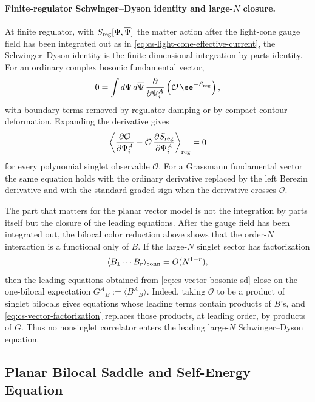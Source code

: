\paragraph{Finite-regulator Schwinger--Dyson identity and large-\(N\) closure.}
At finite regulator, with \(S_{\rm reg}[\Psi,\overline\Psi]\) the matter
action after the light-cone gauge field has been integrated out as in
\eqref{eq:cs-light-cone-effective-current}, the Schwinger--Dyson identity is
the finite-dimensional integration-by-parts identity.  For an ordinary
complex bosonic fundamental vector,
\[
  0
  =
  \int d\Psi\,d\overline\Psi\,
  \frac{\partial}{\partial\Psi_i^A}
  \left(\mathcal O\,\ee^{-S_{\rm reg}}\right),
\]
with boundary terms removed by regulator damping or by compact contour
deformation.  Expanding the derivative gives
\begin{equation}
  \left\langle
  \frac{\partial \mathcal O}{\partial \Psi_i^A}
  -
  \mathcal O\,\frac{\partial S_{\rm reg}}{\partial \Psi_i^A}
  \right\rangle_{\rm reg}
  =
  0
  \label{eq:cs-vector-bosonic-sd}
\end{equation}
for every polynomial singlet observable \(\mathcal O\).  For a Grassmann
fundamental vector the same equation holds with the ordinary derivative
replaced by the left Berezin derivative and with the standard graded sign
when the derivative crosses \(\mathcal O\).

The part that matters for the planar vector model is not the integration by
parts itself but the closure of the leading equations.  After the gauge field
has been integrated out, the bilocal color reduction above shows that the
order-\(N\) interaction is a functional only of \(B\).  If the large-\(N\)
singlet sector has factorization
\begin{equation}
  \langle B_1\cdots B_r\rangle_{\rm conn}=O(N^{1-r}),
  \label{eq:cs-vector-factorization}
\end{equation}
then the leading equations obtained from
\eqref{eq:cs-vector-bosonic-sd} close on the one-bilocal expectation
\(G^A{}_{B}:=\langle B^A{}_{B}\rangle\).  Indeed, taking \(\mathcal O\) to be
a product of singlet bilocals gives equations whose leading terms contain
products of \(B\)'s, and \eqref{eq:cs-vector-factorization} replaces those
products, at leading order, by products of \(G\).  Thus no nonsinglet
correlator enters the leading large-\(N\) Schwinger--Dyson equation.

\subsection{Planar Bilocal Saddle and Self-Energy Equation}


